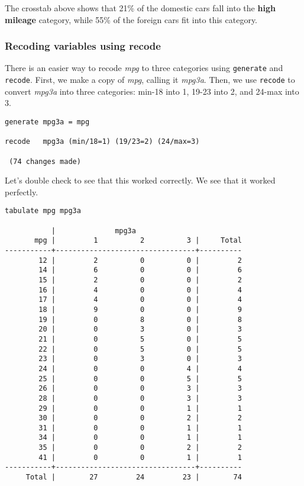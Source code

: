 The crosstab above shows that 21\% of the domestic cars fall into the \textbf{high mileage} category, while 55\% of the foreign cars fit into this category.

\subsubsection{Recoding variables using recode}

There is an easier way to recode \textit{mpg} to three categories using \lstinline{generate} and \lstinline{recode}. First, we make a copy of \textit{mpg}, calling it \textit{mpg3a}. Then, we use \lstinline{recode} to convert \textit{mpg3a} into three categories: min-18 into 1, 19-23 into 2, and 24-max into 3.

\begin{lstlisting}
generate mpg3a = mpg

recode   mpg3a (min/18=1) (19/23=2) (24/max=3)

 (74 changes made)
\end{lstlisting}

Let's double check to see that this worked correctly. We see that it worked perfectly.

\begin{lstlisting}
tabulate mpg mpg3a

           |              mpg3a
       mpg |         1          2          3 |     Total
-----------+---------------------------------+----------
        12 |         2          0          0 |         2
        14 |         6          0          0 |         6
        15 |         2          0          0 |         2
        16 |         4          0          0 |         4
        17 |         4          0          0 |         4
        18 |         9          0          0 |         9
        19 |         0          8          0 |         8
        20 |         0          3          0 |         3
        21 |         0          5          0 |         5
        22 |         0          5          0 |         5
        23 |         0          3          0 |         3
        24 |         0          0          4 |         4
        25 |         0          0          5 |         5
        26 |         0          0          3 |         3
        28 |         0          0          3 |         3
        29 |         0          0          1 |         1
        30 |         0          0          2 |         2
        31 |         0          0          1 |         1
        34 |         0          0          1 |         1
        35 |         0          0          2 |         2
        41 |         0          0          1 |         1
-----------+---------------------------------+----------
     Total |        27         24         23 |        74
\end{lstlisting}


